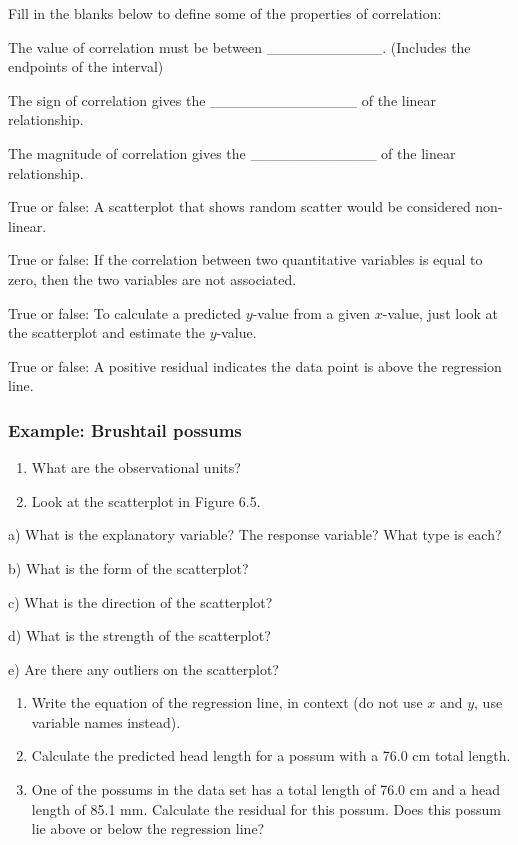 \documentclass[
]{report}
\newcommand{\rgs}{\vspace{12pt}} %
\newcommand{\rgi}{\hspace{24pt}}  %
\begin{document}
Fill in the blanks below to define some of the properties of correlation:

\rgi The value of correlation must be between \_\_\_\_\_\_\_\_\_\_\_. (Includes the endpoints of the interval)

\rgi The sign of correlation gives the \_\_\_\_\_\_\_\_\_\_\_\_\_\_ of the linear relationship.

\rgi The magnitude of correlation gives the \_\_\_\_\_\_\_\_\_\_\_\_ of the linear relationship.

True or false: A scatterplot that shows random scatter would be considered non-linear.

True or false: If the correlation between two quantitative variables is equal to zero, then the two variables are not associated.

True or false: To calculate a predicted \(y\)-value from a given \(x\)-value, just look at the scatterplot and estimate the \(y\)-value.

True or false: A positive residual indicates the data point is above the regression line.

\hypertarget{example-brushtail-possums}{%
\subsubsection*{Example: Brushtail possums}\label{example-brushtail-possums}}

\begin{enumerate}
\def\labelenumi{\arabic{enumi}.}
\item
  What are the observational units?\\
  \rgs
\item
  Look at the scatterplot in Figure 6.5.
\end{enumerate}

\rgi a) What is the explanatory variable? The response variable? What type is each?
\rgs

\rgi b) What is the form of the scatterplot?
\rgs

\rgi c) What is the direction of the scatterplot?
\rgs

\rgi d) What is the strength of the scatterplot?
\rgs

\rgi e) Are there any outliers on the scatterplot?
\rgs

\begin{enumerate}
\def\labelenumi{\arabic{enumi}.}
\setcounter{enumi}{2}
\item
  Write the equation of the regression line, in context (do not use \(x\) and \(y\), use variable names instead).
  \rgs
\item
  Calculate the predicted head length for a possum with a 76.0 cm total length.
  \rgs
\item
  One of the possums in the data set has a total length of 76.0 cm and a head length of 85.1 mm. Calculate the residual for this possum. Does this possum lie above or below the regression line?
  \rgs
\end{enumerate}
\end{document}
